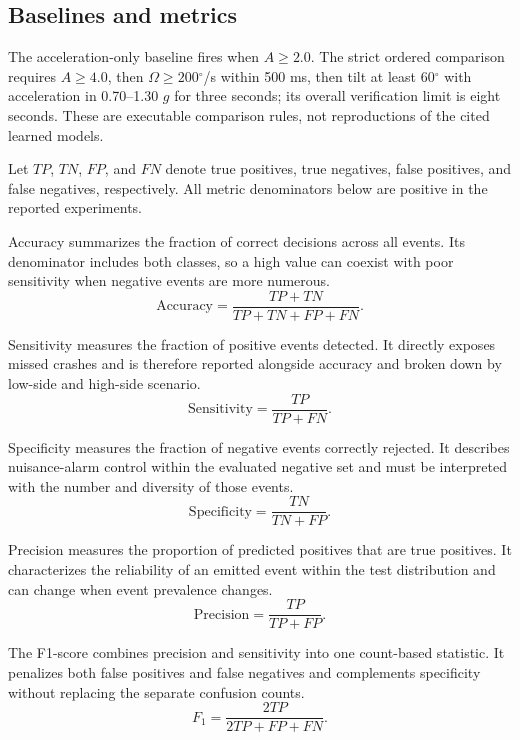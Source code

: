 \documentclass[10pt,a4paper]{article}
\newcommand{\degree}{\ensuremath{^{\circ}}}
\begin{document}
\subsection{Baselines and metrics}
The acceleration-only baseline fires when $A\geq2.0$. The strict ordered comparison requires $A\geq4.0$, then $\Omega\geq200\degree$/s within 500 ms, then tilt at least 60$\degree$ with acceleration in 0.70--1.30 $g$ for three seconds; its overall verification limit is eight seconds. These are executable comparison rules, not reproductions of the cited learned models.

Let $TP$, $TN$, $FP$, and $FN$ denote true positives, true negatives, false positives, and false negatives, respectively. All metric denominators below are positive in the reported experiments.

Accuracy summarizes the fraction of correct decisions across all events. Its denominator includes both classes, so a high value can coexist with poor sensitivity when negative events are more numerous.
\begin{equation}\label{eq:accuracy} \mathrm{Accuracy}=\frac{TP+TN}{TP+TN+FP+FN}.\end{equation}

Sensitivity measures the fraction of positive events detected. It directly exposes missed crashes and is therefore reported alongside accuracy and broken down by low-side and high-side scenario.
\begin{equation}\label{eq:sensitivity} \mathrm{Sensitivity}=\frac{TP}{TP+FN}.\end{equation}

Specificity measures the fraction of negative events correctly rejected. It describes nuisance-alarm control within the evaluated negative set and must be interpreted with the number and diversity of those events.
\begin{equation}\label{eq:specificity} \mathrm{Specificity}=\frac{TN}{TN+FP}.\end{equation}

Precision measures the proportion of predicted positives that are true positives. It characterizes the reliability of an emitted event within the test distribution and can change when event prevalence changes.
\begin{equation}\label{eq:precision} \mathrm{Precision}=\frac{TP}{TP+FP}.\end{equation}

The F1-score combines precision and sensitivity into one count-based statistic. It penalizes both false positives and false negatives and complements specificity without replacing the separate confusion counts.
\begin{equation}\label{eq:f1} F_1=\frac{2TP}{2TP+FP+FN}.\end{equation}
\end{document}
